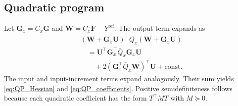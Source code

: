 ﻿\documentclass[journal]{IEEEtran}
\newcommand{\mF}{\mathbf{F}}
\newcommand{\mG}{\mathbf{G}}
\newcommand{\mU}{\mathbf{U}}
\newcommand{\mW}{\mathbf{W}}
\begin{document}
\subsection*{Quadratic program}
Let $\mG_x=\bar C_x\mG$ and $\mW=\bar C_x\mF-Y^{\mathrm{ref}}$. The output term expands as
\begin{equation}
    \begin{aligned}
    &(\mW+\mG_x\mU)^\top\bar Q_x(\mW+\mG_x\mU)\\
    &\quad=\mU^\top\mG_x^\top\bar Q_x\mG_x\mU\\
    &\qquad+2(\mG_x^\top\bar Q_x\mW)^\top\mU+\mathrm{const}.
    \end{aligned}
\end{equation}
The input and input-increment terms expand analogously. Their sum yields \eqref{eq:QP_Hessian} and \eqref{eq:QP_coefficients}. Positive semidefiniteness follows because each quadratic coefficient has the form $T^\top MT$ with $M\succeq0$.
\end{document}
